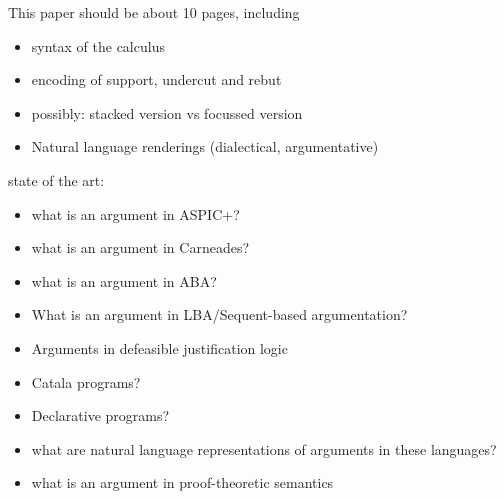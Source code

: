 \documentclass{ecai}
\begin{document}
\begin{scratch}

  \begin{abstract}

    length 100-300 words
    \begin{itemize}
    \item Recently interest in proof theoretic analysis of argumentation
    \item Arguments as computational objects have received less attention
    \item Interactive theorem prover community has made efforts to develop suitable proof languages
    \item This includes representing partial proofs.
    \item Leverage this approach to the representation of arguments.
    \item Take steps towards a proofs-as-programs understanding of argument.
    \item control flow and dialectical interpretation of lambda bar mu tilde mu.
    \end{itemize}
  \end{abstract}
  
  This paper should be about 10 pages, including
  \begin{itemize}
  \item syntax of the calculus
  \item encoding of support, undercut and rebut
  \item possibly: stacked version vs focussed version
  \item Natural language renderings (dialectical, argumentative)
  \end{itemize}

  state of the art:

  \begin{itemize}
  \item what is an argument in ASPIC+?
  \item what is an argument in Carneades?
  \item what is an argument in ABA?
  \item What is an argument in LBA/Sequent-based argumentation?
  \item Arguments in defeasible justification logic
  \item Catala programs?
  \item Declarative programs?
  \item what are natural language representations of arguments in these languages?
  \item what is an argument in proof-theoretic semantics
  \end{itemize}


\end{scratch}
\end{document}
